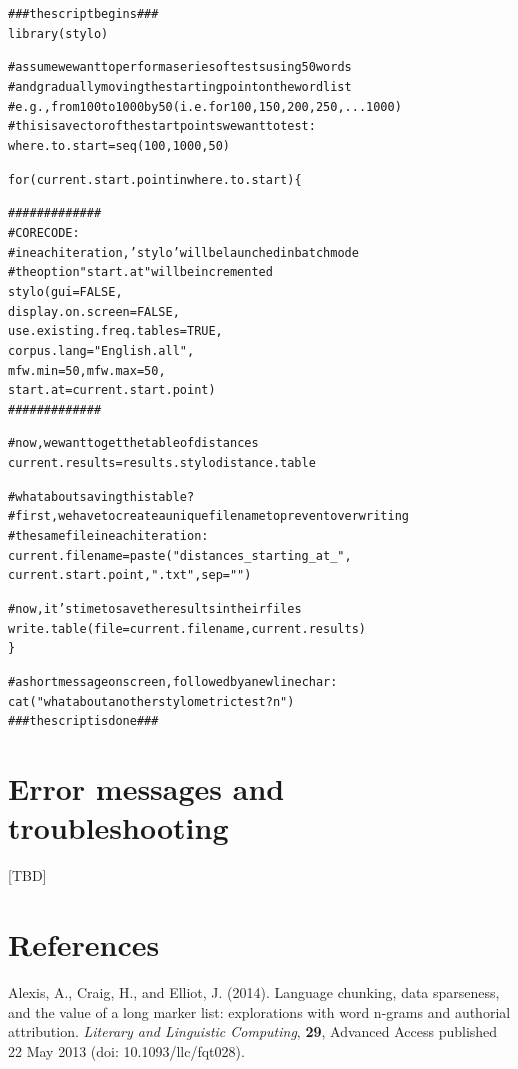 \documentclass[11pt,a4paper]{article}
\begin{document}
\begin{alltt}
### the script begins ###
library(stylo)

# assume we want to perform a series of tests using 50 words
# and gradually moving the starting point on the wordlist
# e.g., from 100 to 1000 by 50 (i.e. for 100, 150, 200, 250, ... 1000)
# this is a vector of the start points we want to test:
where.to.start = seq(100,1000,50)

for(current.start.point in where.to.start) \{ 

    #############
    # CORE CODE:
    # in each iteration, 'stylo' will be launched in batch mode
    # the option "start.at" will be incremented
    stylo(gui = FALSE,
          display.on.screen = FALSE,
          use.existing.freq.tables = TRUE,
          corpus.lang = "English.all",
          mfw.min = 50, mfw.max = 50,
          start.at = current.start.point) 
    #############

  # now, we want to get the table of distances
  current.results = results.stylodistance.table

  # what about saving this table?
  # first, we have to create a unique file name to prevent overwriting
  # the same file in each iteration:
  current.filename = paste("distances_starting_at_",
                       current.start.point, ".txt", sep="")
                       
  # now, it's time to save the results in their files
  write.table(file = current.filename, current.results)
\}

# a short message on screen, followed by a newline char:
cat("what about another stylometric test?n")
### the script is done ###
\end{alltt}






\section{Error messages and troubleshooting}

[TBD]


\section*{References}


\indent

Alexis, A., Craig, H., and Elliot, J. (2014). Language chunking, data
sparseness, and the value of a long marker list: explorations with
word n-grams and authorial attribution. \textit{Literary and Linguistic
Computing}, \textbf{29}, Advanced Access published 22 May 2013 
(doi: 10.1093/llc/fqt028).
\end{document}
